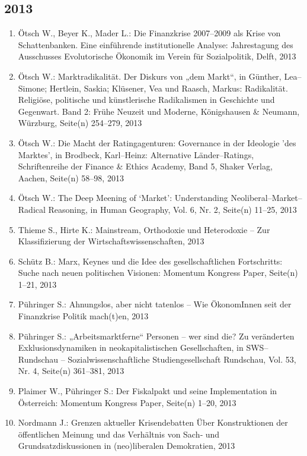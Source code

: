 \subsection*{2013}
\begin{enumerate}
    	 \item Ötsch W., Beyer K., Mader L.: Die Finanzkrise 2007--2009 als Krise von Schattenbanken. Eine einführende institutionelle Analyse: Jahrestagung des Ausschusses Evolutorische Ökonomik im Verein für Sozialpolitik, Delft, 2013
	 \item Ötsch W.: Marktradikalität. Der Diskurs von „dem Markt“, in Günther, Lea--Simone; Hertlein, Saskia;  Klüsener, Vea und Raasch, Markus: Radikalität. Religiöse, politische und künstlerische Radikalismen in Geschichte und Gegenwart.  Band 2: Frühe Neuzeit und Moderne, Königshausen \& Neumann, Würzburg, Seite(n) 254--279, 2013
	 \item Ötsch W.: Die Macht der Ratingagenturen: Governance in der Ideologie 'des Marktes', in Brodbeck, Karl--Heinz: Alternative Länder--Ratings, Schriftenreihe der Finance \& Ethics Academy, Band 5, Shaker Verlag, Aachen, Seite(n) 58--98, 2013
	 \item Ötsch W.: The Deep Meening of ‘Market’: Understanding Neoliberal--Market--Radical Reasoning, in Human Geography, Vol. 6, Nr. 2, Seite(n) 11--25, 2013
	 \item Thieme S., Hirte K.: Mainstream, Orthodoxie und Heterodoxie – Zur Klassifizierung der Wirtschaftswissenschaften, 2013
	 \item Schütz B.: Marx, Keynes und die Idee des gesellschaftlichen Fortschritts: Suche nach neuen politischen Visionen: Momentum Kongress Paper, Seite(n) 1--21, 2013
	 \item Pühringer S.: Ahnungslos, aber nicht tatenlos – Wie ÖkonomInnen seit der Finanzkrise Politik mach(t)en, 2013
	 \item Pühringer S.: „Arbeitsmarktferne“ Personen – wer sind die? Zu veränderten Exklusionsdynamiken in neokapitalistischen Gesellschaften, in SWS--Rundschau -- Sozialwissenschaftliche Studiengesellschaft Rundschau, Vol. 53, Nr. 4, Seite(n) 361--381, 2013
	 \item Plaimer W., Pühringer S.: Der Fiskalpakt und seine Implementation in Österreich: Momentum Kongress Paper, Seite(n) 1--20, 2013
	 \item Nordmann J.: Grenzen aktueller Krisendebatten Über Konstruktionen der öffentlichen Meinung und das Verhältnis von Sach‐ und Grundsatzdiskussionen in (neo)liberalen Demokratien, 2013

\end{enumerate}
